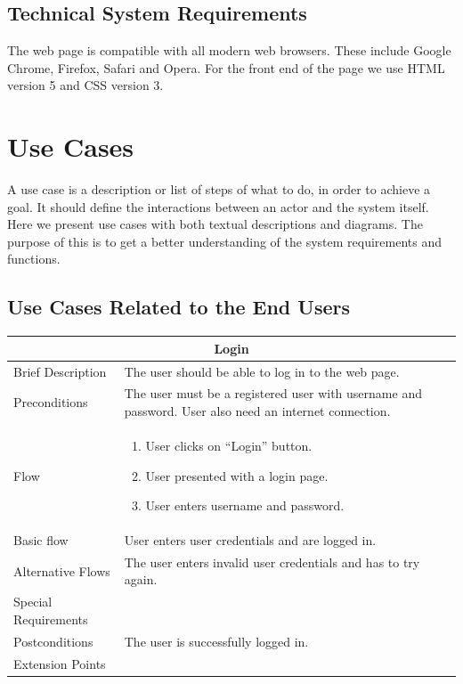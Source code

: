 \subsection{Technical System Requirements}
\label{subsec:SysReqReqsTechnical}
The web page is compatible with all modern web browsers. These include Google Chrome, Firefox, Safari and Opera. For the front end of the page we use HTML version 5 and CSS version 3.

\section{Use Cases}
\label{sec:SysReqUseCases}

A use case is a description or list of steps of what to do, in order to achieve a goal. It should define the interactions between an actor and the system itself. Here we present use cases with both textual descriptions and diagrams. The purpose of this is to get a better understanding of the system requirements and functions.

\subsection{Use Cases Related to the End Users}

\begin{minipage}{\linewidth}
\begin{tabular}{|l|p{85mm}|}
  \hline
  \multicolumn{2}{|c|}{\cellcolor{gray!25} \textbf{Login}} \\
  \hline
  Brief Description & The user should be able to log in to the web page.\\
  Preconditions & The user must be a registered user with username and password. User also need an internet connection.\\
  Flow &
    \begin{enumerate}
      \item User clicks on “Login” button.
      \item User presented with a login page.
      \item User enters username and password.
    \end{enumerate} \\
  Basic flow & User enters user credentials and are logged in.\\
  Alternative Flows & The user enters invalid user credentials and has to try again.\\
  Special Requirements & \\
  Postconditions & The user is successfully logged in.\\
  Extension Points & \\
  \hline
\end{tabular}
\end{minipage}

